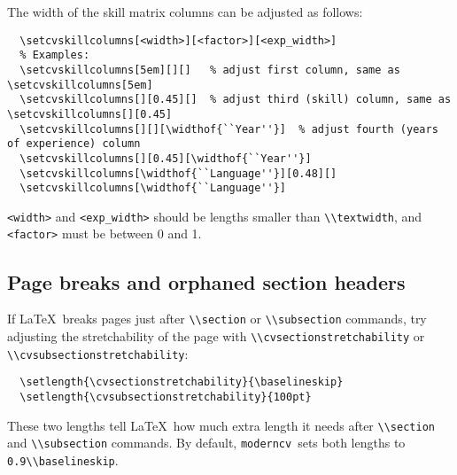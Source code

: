 \documentclass[a4paper, 11pt]{article}
\newcommand{\code}[1]{\lstinline!#1!}
\newcommand{\moderncv}{\code{moderncv}}
\newcommand{\Moderncv}{\moderncv~}
\newcommand{\Latex}{\LaTeX~}
\begin{document}
The width of the skill matrix columns can be adjusted as follows:
\begin{lstlisting}
  \setcvskillcolumns[<width>][<factor>][<exp_width>]
  % Examples:
  \setcvskillcolumns[5em][][]   % adjust first column, same as \setcvskillcolumns[5em]
  \setcvskillcolumns[][0.45][]  % adjust third (skill) column, same as \setcvskillcolumns[][0.45]
  \setcvskillcolumns[][][\widthof{``Year''}]  % adjust fourth (years of experience) column
  \setcvskillcolumns[][0.45][\widthof{``Year''}]
  \setcvskillcolumns[\widthof{``Language''}][0.48][]
  \setcvskillcolumns[\widthof{``Language''}]
\end{lstlisting}
\code{<width>} and \code{<exp_width>} should be lengths smaller than \code{\\textwidth}, and \code{<factor>} must be between 0 and 1.

\subsection{Page breaks and orphaned section headers}
If \Latex breaks pages just after \code{\\section} or \code{\\subsection} commands, try adjusting the stretchability of the page with \code{\\cvsectionstretchability} or \code{\\cvsubsectionstretchability}:
\begin{lstlisting}
  \setlength{\cvsectionstretchability}{\baselineskip}
  \setlength{\cvsubsectionstretchability}{100pt}
\end{lstlisting}
These two lengths tell \Latex how much extra length it needs after \code{\\section} and \code{\\subsection} commands.
By default, \Moderncv sets both lengths to \code{0.9\\baselineskip}.
\end{document}
